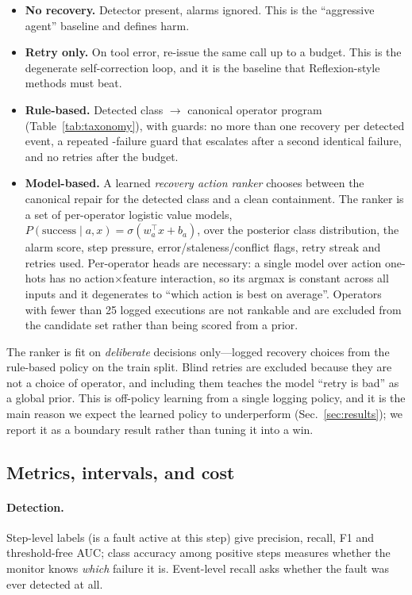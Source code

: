 \begin{itemize}
\item \textbf{No recovery.} Detector present, alarms ignored. This is the ``aggressive agent''
baseline and defines harm.
\item \textbf{Retry only.} On tool error, re-issue the same call up to a budget. This is the
degenerate self-correction loop, and it is the baseline that Reflexion-style methods must beat.
\item \textbf{Rule-based.} Detected class $\rightarrow$ canonical operator program
(Table~\ref{tab:taxonomy}), with guards: no more than one recovery per detected event, a repeated
-failure guard that escalates after a second identical failure, and no retries after the budget.
\item \textbf{Model-based.} A learned \emph{recovery action ranker} chooses between the canonical
repair for the detected class and a clean containment. The ranker is a set of per-operator logistic
value models, $P(\text{success}\mid a, x)=\sigma(w_a^\top x + b_a)$, over the posterior class
distribution, the alarm score, step pressure, error/staleness/conflict flags, retry streak and
retries used. Per-operator heads are necessary: a single model over action one-hots has no
action$\times$feature interaction, so its argmax is constant across all inputs and it degenerates to
``which action is best on average''. Operators with fewer than 25 logged executions are not
rankable and are excluded from the candidate set rather than being scored from a prior.
\end{itemize}

The ranker is fit on \emph{deliberate} decisions only---logged recovery choices from the rule-based
policy on the train split. Blind retries are excluded because they are not a choice of operator, and
including them teaches the model ``retry is bad'' as a global prior. This is off-policy learning
from a single logging policy, and it is the main reason we expect the learned policy to underperform
(Sec.~\ref{sec:results}); we report it as a boundary result rather than tuning it into a win.

\subsection{Metrics, intervals, and cost}

\paragraph{Detection.} Step-level labels (is a fault active at this step) give precision, recall, F1
and threshold-free AUC; class accuracy among positive steps measures whether the monitor knows
\emph{which} failure it is. Event-level recall asks whether the fault was ever detected at all.

